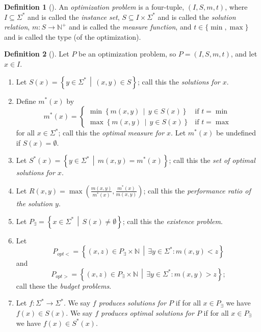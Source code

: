 \documentclass[]{article}
\theoremstyle{plain}
\theoremstyle{definition}
\newtheorem{definition}{Definition}
\newcommand{\lb}{\left\{}
\newcommand{\rb}{\right\}}
\newcommand{\st}{\,\middle|\,}
\begin{document}
\begin{definition}[\cite{acgkmp99}]
  An \emph{optimization problem} is a four-tuple, $(I, S, m, t)$, where $I\subseteq \Sigma^*$ and is called the \emph{instance set}, $S\subseteq I\times \Sigma^*$ and is called the \emph{solution relation}, $m\colon S\to \mathbb{N}^+$ and is called the \emph{measure function}, and $t\in\{\min, \max\}$ and is called the type (of the optimization).
\end{definition}

\begin{definition}[\cite{tantau07}]
  Let $P$ be an optimization problem, so $P=(I, S, m, t)$, and let $x\in I$.
  \begin{enumerate}
  \item Let $S(x)=\lb y\in\Sigma^* \st (x, y)\in S \rb$; call this the \emph{solutions for $x$}.
  \item Define $m^*(x)$ by
    \begin{displaymath}
      m^*(x) =
      \begin{cases}
        \min \lb m(x, y) \st y\in S(x) \rb & \text{if } t = \min \\
        \max \lb m(x, y) \st y\in S(x) \rb & \text{if } t = \max
      \end{cases}
    \end{displaymath}
    for all $x\in \Sigma^*$; call this the \emph{optimal measure for $x$}.
    Let $m^*(x)$ be undefined if $S(x)=\emptyset$.
  \item Let $S^*(x)=\lb y\in\Sigma^* \st m(x, y) = m^*(x) \rb$; call this the \emph{set of optimal solutions for $x$}.
  \item Let $R(x, y)=\max\left( \frac{m(x, y)}{m^*(x)}, \frac{m^*(x)}{m(x, y)} \right)$; call this the \emph{performance ratio of the solution $y$}.
  \item Let $P_\exists = \lb x\in \Sigma^* \st S(x) \neq \emptyset \rb$; call this the \emph{existence problem}.
  \item Let
    \begin{displaymath}
      P_{opt<}=\lb (x, z) \in P_\exists\times\mathbb{N} \st \exists y\in\Sigma^*\colon m(x, y) < z \rb
    \end{displaymath}
    and
    \begin{displaymath}
      P_{opt>}=\lb (x, z) \in P_\exists\times\mathbb{N} \st \exists y\in\Sigma^*\colon m(x, y) > z \rb;
    \end{displaymath}
    call these the \emph{budget problems}.
  \item Let $f\colon \Sigma^*\to\Sigma^*$.
    We say \emph{$f$ produces solutions for $P$} if for all $x\in P_\exists$ we have $f(x)\in S(x)$.
    We say \emph{$f$ produces optimal solutions for $P$} if for all $x\in P_\exists$ we have $f(x)\in S^*(x)$.
  \end{enumerate}
\end{definition}
\end{document}
